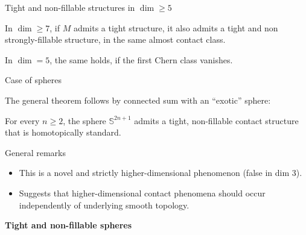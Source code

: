 \documentclass{beamer}
\begin{document}
\begin{frame}{Tight and non-fillable structures in $\dim \geq 5$}

\begin{theorem}
In $\dim \geq 7$, if $M$ admits a tight structure, it also admits a tight and non strongly-fillable structure, in the same almost contact class. 
\pause

\smallskip

In $\dim=5$, the same holds, if the first Chern class vanishes.
\end{theorem}

    
\end{frame}

\begin{frame}{Case of spheres}

The general theorem follows by connected sum with an ``exotic'' sphere:

\begin{theorem}
    For every $n \geq 2$, the sphere $\mathbb S^{2n+1}$ admits a tight, non-fillable contact structure that is homotopically standard.
\end{theorem}
    
\end{frame}

\begin{frame}{General remarks}

\begin{itemize}
    \item This is a novel and strictly higher-dimensional phenomenon (false in dim $3$).

\pause
    
    \item Suggests that higher-dimensional contact phenomena should occur independently of underlying smooth topology.
\end{itemize}

    
\end{frame}

\begin{frame}
\begin{tcolorbox}
\Huge \begin{center}
    \textbf{Tight and non-fillable spheres}
\end{center}
\end{tcolorbox}
\end{frame}
\end{document}
